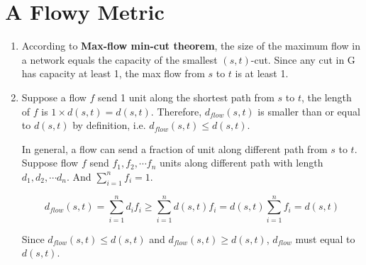 \documentclass[11pt]{article}
\newenvironment{qparts}{\begin{enumerate}[{(}a{)}]}{\end{enumerate}}
\begin{document}
\section{A Flowy Metric}
\begin{qparts}
	
	\item 

	According to \textbf{Max-flow min-cut theorem}, the size of the maximum flow in a network equals the capacity of the smallest $(s, t)$-cut. Since any cut in G has capacity at least 1, the max flow from $s$ to $t$ is at least 1.
	
	\item
	
	Suppose a flow $f$ send 1 unit along the shortest path from $s$ to $t$, the length of $f$ is $1 \times d(s, t) = d(s, t)$. Therefore, $d_{flow}(s,t)$ is smaller than or equal to $d(s,t)$ by definition, i.e. $d_{flow}(s,t) \le d(s,t)$.
	
	In general, a flow can send a fraction of unit along different path from $s$ to $t$. Suppose flow $f$ send $f_1, f_2, \cdots f_n$ units along different path with length $d_1, d_2, \cdots d_n$. And $\sum_{i=1}^n f_i = 1$.
	
	\[
		d_{flow}(s,t) = \sum_{i=1}^n d_if_i \ge \sum_{i=1}^n d(s,t) f_i = d(s,t) \sum_{i=1}^n  f_i = d(s,t)
	\]
	
	Since $d_{flow}(s,t) \le d(s,t)$ and $d_{flow}(s,t) \ge d(s,t)$, $d_{flow}$ must equal to $d(s,t)$.
		
\end{qparts}
\end{document}
